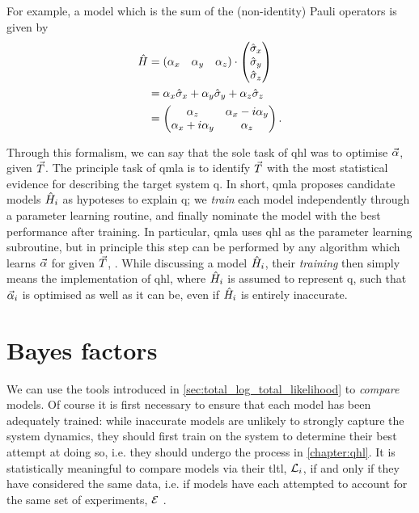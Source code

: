 For example, a model which is the sum of the (non-identity) Pauli operators is given by
\begin{align}
    \label{eqn:pauli_sum_model}
    \begin{split}
        \hat{H} &= \begin{matrix}(\alpha_x & \alpha_y & \alpha_z)\end{matrix} \cdot \left(\begin{matrix}\hat{\sigma}_{x} \\ \hat{\sigma}_{y} \\ \hat{\sigma}_{z}\end{matrix}\right) \\
        &= \alpha_x \hat{\sigma}_{x} + \alpha_y \hat{\sigma}_{y} + \alpha_z \hat{\sigma}_{z} \\
        &= \begin{pmatrix}
            \alpha_z & \alpha_x - i \alpha_y \\
            \alpha_x + i\alpha_y & \alpha_z
        \end{pmatrix}.
    \end{split}
\end{align}
\par 

Through this formalism, we can say that the sole task of \gls{qhl} was to optimise $\vec{\alpha}$, given ${ \vec{T} }$. 
The principle task of \gls{qmla} is to identify ${ \vec{T} }$ with the most statistical evidence 
    for describing the target system \gls{q}. 
In short, \gls{qmla} proposes candidate models $\hat{H}_i$ as hypoteses to explain \gls{q}; 
    we \emph{train} each model independently through a parameter learning routine, 
    and finally nominate the model with the best performance after training. 
In particular, \gls{qmla} uses \gls{qhl} as the parameter learning subroutine, 
    but in principle this step can be performed by any algorithm which learns $\vec{\alpha}$ for given ${ \vec{T} }$, 
    \cite{wang2015hamiltonian, krastanov2019stochastic, flurin2020using, niu2019learning, 
    greplova2017quantum,lokhov2018optimal, acampora2019evolutionary, burgarth2017evolution}. 
While discussing a model $\hat{H}_i$, their \emph{training} then simply means the implementation 
    of \gls{qhl}, where $\hat{H}_i$ is assumed to represent \gls{q}, 
    such that $\vec{\alpha}_i$ is optimised as well as it can be, even if $\hat{H}_i$ is entirely inaccurate. 

\section{Bayes factors}\label{sec:bayes_factors}
We can use the tools introduced in \cref{sec:total_log_total_likelihood} to \emph{compare} models. 
Of course it is first necessary to ensure that each model has  
    been adequately trained: while inaccurate models are unlikely to strongly 
    capture the system dynamics, they should first train on the system 
    to determine their best attempt at doing so, 
    i.e. they should undergo the process in \cref{chapter:qhl}.
It is statistically meaningful to compare models via their \gls{tltl}, ${\mathcal{L}}_i$, 
    if and only if they have considered the same data, 
    i.e. if models have each attempted to account for the same set of experiments, ${ \mathcal{E} }$ \cite{kass1995bayes}.
\par 

